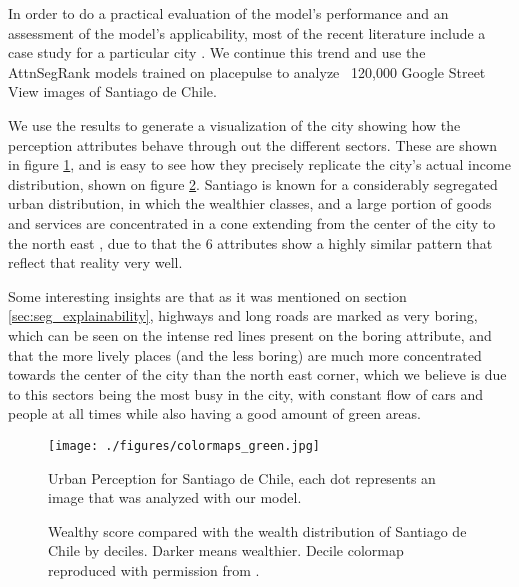 In order to do a practical evaluation of the model's performance and an assessment
of the model's applicability, most of the recent literature include a case study
for  a particular city \cite{rossetti, zhang_measuring, zhang_uncovering, quercia_aesthetic,tamara_judgments,liu_machine}.
We continue this trend and use the AttnSegRank models trained on placepulse
to analyze ~120,000 Google Street View images of Santiago de Chile.

We use the results to generate a visualization of the city showing how the perception
attributes behave through out the different sectors. These are shown in figure
\ref{fig:colormaps}, and is easy to see how they precisely replicate the city's actual
income distribution, shown on figure \ref{fig:eod}. Santiago is known for a considerably
segregated urban distribution, in which the wealthier classes, and a large portion
of goods and services are concentrated in a cone extending from the center of the city
to the north east \cite{sabatini_segregacion}, due to that the 6 attributes show a
highly similar pattern that reflect that reality very well.

Some interesting insights are that as it was mentioned on section \ref{sec:seg_explainability},
highways and long roads are marked as very boring, which can be seen on the intense
red lines present on the boring attribute, and that the more lively places (and the less boring)
are much more concentrated towards the center of the city than the north east corner, which
we believe is due to this sectors being the most busy in the city, with constant flow
of cars and people at all times while also having a good amount of green areas.

\begin{figure}[ht]
	\begin{center}
	\texttt{[image: ./figures/colormaps\_green.jpg]}
	\caption[Urban Perception for Santiago de Chile]{
        Urban Perception for Santiago de Chile, each dot represents an image that
        was analyzed with our model.
    }
	\label{fig:colormaps}
	\end{center}
\end{figure}

\begin{figure}[ht]
	\centering
	\caption[Wealthy score vs wealth distribution of Santiago de Chile]{
        Wealthy score compared with the wealth distribution of Santiago de Chile by deciles. Darker means wealthier.
        Decile colormap reproduced  with permission from .
    }
	\label{fig:eod}
\end{figure}

